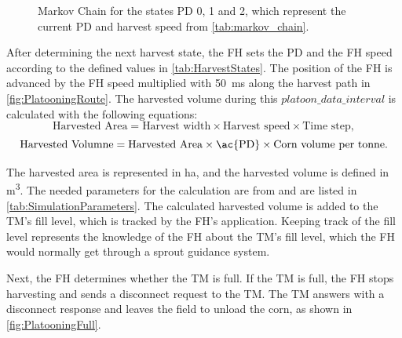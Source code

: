 \begin{figure}[H]
\centering
{}
\caption{Markov Chain for the states \acf{PD} 0, 1 and 2, which represent the current \ac{PD} and
harvest speed from \autoref{tab:markov_chain}.}
\label{fig:MarkovChain}
\end{figure}

After determining the next harvest state, the \ac{FH} sets the \ac{PD} and the \ac{FH} speed according to the defined values in
\autoref{tab:HarvestStates}.
The position of the \ac{FH} is advanced by the \ac{FH} speed multiplied with \SI{50}{\milli\second} along the
harvest path in \autoref{fig:PlatooningRoute}.
The harvested volume during this $platoon\_data\_interval$ is calculated with the following
equations:
\begin{equation}
   \label{eq:AreaCalculation}
   \text{Harvested Area} =
      \text{Harvest width} \times \text{Harvest speed} \times \text{Time step}
   ,
\end{equation}
\begin{equation}
   \label{eq:VolumneCalculation}
   \text{Harvested Volumne} =
   \text{Harvested Area} \times \text{\ac{PD}} \times \text{Corn volume per tonne}.
\end{equation}

The harvested area is represented in \si{\hectare}, and
the harvested volume is defined in \si{\cubic\metre}.
The needed parameters for the calculation are from \cite{faustzahlen2018} and are listed in \autoref{tab:SimulationParameters}.
The calculated harvested volume is added to the \ac{TM}'s fill level, which is tracked by the \ac{FH}'s application.
Keeping track of the fill level represents the knowledge of the \ac{FH} about the \ac{TM}'s fill level, which the \ac{FH} would
normally get through a sprout guidance system.

Next, the \ac{FH} determines whether the \ac{TM} is full.
If the \ac{TM} is full, the \ac{FH} stops harvesting and sends a disconnect request to the \ac{TM}.
The \ac{TM} answers with a disconnect response and leaves the field to unload the corn, as shown in \autoref{fig:PlatooningFull}.


